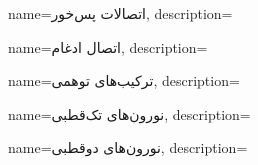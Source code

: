 {
name={اتصالات پس‌خور},
description=\hfill{}
}

{
name={اتصال ادغام},
description=\hfill{}
}

{
name={ترکیب‌های توهمی},
description=\hfill{}
}

{
	name={نورون‌های تک‌قطبی},
	description=\hfill{}
}

{
	name={نورون‌های دوقطبی},
	description=\hfill{}
}

%
%
%
%

